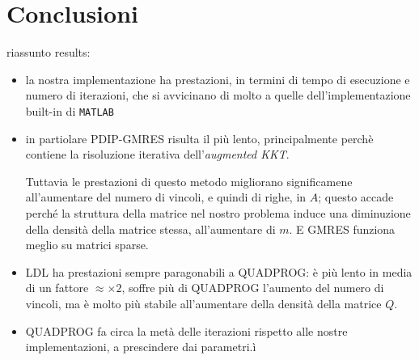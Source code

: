 \section{Conclusioni}
riassunto results:
\begin{itemize}
    \item la nostra implementazione ha prestazioni, in termini di tempo di esecuzione e numero di iterazioni, che si avvicinano di molto a quelle dell'implementazione built-in di \texttt{MATLAB}
    \item  in partiolare PDIP-GMRES risulta il più lento, principalmente perchè contiene la risoluzione iterativa dell'\textit{augmented KKT}. 
    
    Tuttavia le prestazioni di questo metodo migliorano significamene all'aumentare del numero di vincoli, e quindi di righe, in $A$; questo accade perché la struttura della matrice nel nostro problema induce una diminuzione della densità della matrice stessa, all'aumentare di $m$. E GMRES funziona meglio su matrici sparse.
    
    \item LDL ha prestazioni sempre paragonabili a QUADPROG: è più lento in media di un fattore $\approx\times2$, soffre più di QUADPROG l'aumento del numero di vincoli, ma è molto più stabile all'aumentare della densità della matrice $Q$.
    
    \item QUADPROG fa circa la metà delle iterazioni rispetto alle nostre implementazioni, a prescindere dai parametri.ì

\end{itemize}